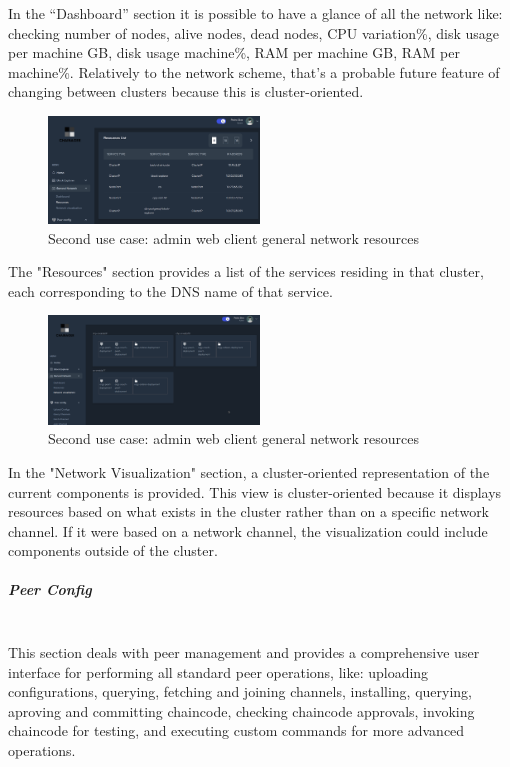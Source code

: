 In the “Dashboard” section it is possible to have a glance of all the network like: checking number of nodes, alive nodes, dead nodes, CPU variation\%, disk usage per machine GB, disk usage machine\%, RAM per machine GB, RAM per machine\%. Relatively to the network scheme, that's a probable future feature of changing between clusters because this is cluster-oriented.

\begin{figure}[H]
    \centering
    \includegraphics[width=0.5\textwidth]{assets/use-case-2/general-network-resources.png} %
    \caption{Second use case: admin web client general network resources}
    \label{fig:sample-image} 
\end{figure}

The "Resources" section provides a list of the services residing in that cluster, each corresponding to the DNS name of that service.

\begin{figure}[H]
    \centering
    \includegraphics[width=0.5\textwidth]{assets/use-case-2/network-visualization.png} %
    \caption{Second use case: admin web client general network resources}
    \label{fig:sample-image} 
\end{figure}

In the "Network Visualization" section, a cluster-oriented representation of the current components is provided. This view is cluster-oriented because it displays resources based on what exists in the cluster rather than on a specific network channel. If it were based on a network channel, the visualization could include components outside of the cluster.

\subparagraph{Peer Config}\mbox{}\\
This section deals with peer management and provides a comprehensive user interface for performing all standard peer operations, like: uploading configurations, querying, fetching and joining channels, installing, querying, aproving and committing chaincode, checking chaincode approvals, invoking chaincode for testing, and executing custom commands for more advanced operations.

